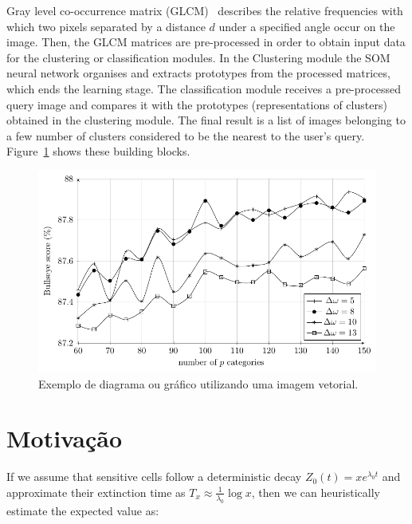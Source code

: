 \documentclass{classe_cn}                 %
\begin{document}
Gray level co-occurrence matrix (GLCM)~\cite{Ferris:2003} describes the relative frequencies with which two pixels separated by a distance $d$ under a specified angle occur on the image. Then, the GLCM matrices are pre-processed in order to obtain input data for the clustering or classification modules. In the Clustering module the SOM neural network organises and extracts prototypes from the processed matrices, which ends the learning stage. The classification module receives a pre-processed query image and compares it with the prototypes (representations of clusters) obtained in the clustering module. The final result is a list of images belonging to a few number of clusters considered to be the nearest to the user's query. Figure~\ref{tag_figura_02} shows these building blocks.

\begin{figure}[h!]
  \begin{center}
    \includegraphics[width=1.0 \textwidth]{resultado.pdf}
    \caption{Exemplo de diagrama ou gráfico utilizando uma imagem vetorial.} 
    \label{tag_figura_02}
  \end{center}
\end{figure}

\section{Motivação}

If we assume that sensitive cells follow a deterministic decay $Z_0(t) = xe^{\lambda_0 t}$ and approximate their extinction time as $T_x \approx \frac{1}{\lambda_0} \log x$, then we can heuristically estimate the expected value as:
\end{document}

